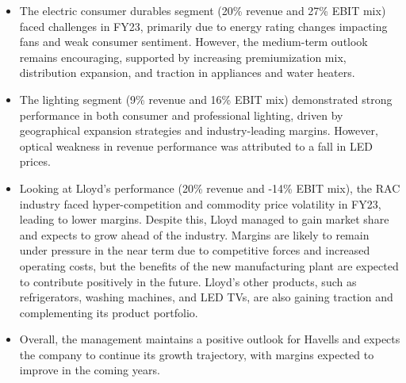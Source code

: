 \begin{itemize}
  \item The electric consumer durables segment (20\% revenue and 27\% EBIT mix) faced challenges in FY23, primarily due to energy rating changes impacting fans and weak consumer sentiment. However, the medium-term outlook remains encouraging, supported by increasing premiumization mix, distribution expansion, and traction in appliances and water heaters.

  \item The lighting segment (9\% revenue and 16\% EBIT mix) demonstrated strong performance in both consumer and professional lighting, driven by geographical expansion strategies and industry-leading margins. However, optical weakness in revenue performance was attributed to a fall in LED prices.

  \item Looking at Lloyd's performance (20\% revenue and -14\% EBIT mix), the RAC industry faced hyper-competition and commodity price volatility in FY23, leading to lower margins. Despite this, Lloyd managed to gain market share and expects to grow ahead of the industry. Margins are likely to remain under pressure in the near term due to competitive forces and increased operating costs, but the benefits of the new manufacturing plant are expected to contribute positively in the future. Lloyd's other products, such as refrigerators, washing machines, and LED TVs, are also gaining traction and complementing its product portfolio.

  \item Overall, the management maintains a positive outlook for Havells and expects the company to continue its growth trajectory, with margins expected to improve in the coming years.
\end{itemize}


